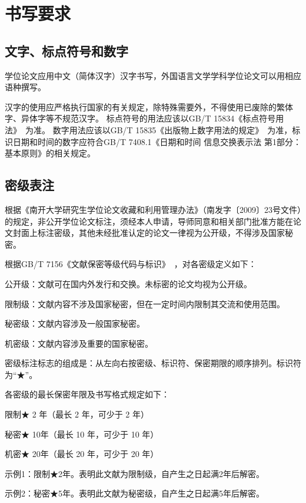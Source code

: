 \chapter{书写要求}
\label{chap:writing-requirements}

\section{文字、标点符号和数字}

学位论文应用中文（简体汉字）汉字书写，外国语言文学学科学位论文可以用相应语种撰写。

汉字的使用应严格执行国家的有关规定，除特殊需要外，不得使用已废除的繁体字、异体字等不规范汉字。
标点符号的用法应该以GB/T 15834《标点符号用法》~\cite{SCSF00038090}为准。
数字用法应该以GB/T 15835《出版物上数字用法的规定》~\cite{SCSF00036561}为准，标识日期和时间的数字应符合GB/T 7408.1《日期和时间 信息交换表示法 第1部分：基本原则》的相关规定。

\section{密级表注}
\label{sec:writing-classification}

根据《南开大学研究生学位论文收藏和利用管理办法》（南发字〔2009〕23号文件）的规定，非公开学位论文标注，须经本人申请，导师同意和相关部门批准方能在论文封面上标注密级，其他未经批准认定的论文一律视为公开级，不得涉及国家秘密。

根据GB/T 7156《文献保密等级代码与标识》~\cite{SCSF00000734}，对各密级定义如下：

公开级：文献可在国内外发行和交换。未标密的论文均视为公开级。

限制级：文献内容不涉及国家秘密，但在一定时间内限制其交流和使用范围。

秘密级：文献内容涉及一般国家秘密。

机密级：文献内容涉及重要的国家秘密。

密级标注标志的组成是：从左向右按密级、标识符、保密期限的顺序排列。标识符为“★”。

各密级的最长保密年限及书写格式规定如下：

限制★ 2 年（最长 2 年，可少于 2 年）

秘密★ 10年（最长 10 年，可少于 10 年）

机密★ 20年（最长 20 年，可少于 20 年）

示例1：限制★2年。表明此文献为限制级，自产生之日起满2年后解密。

示例2：秘密★5年。表明此文献为秘密级，自产生之日起满5年后解密。

